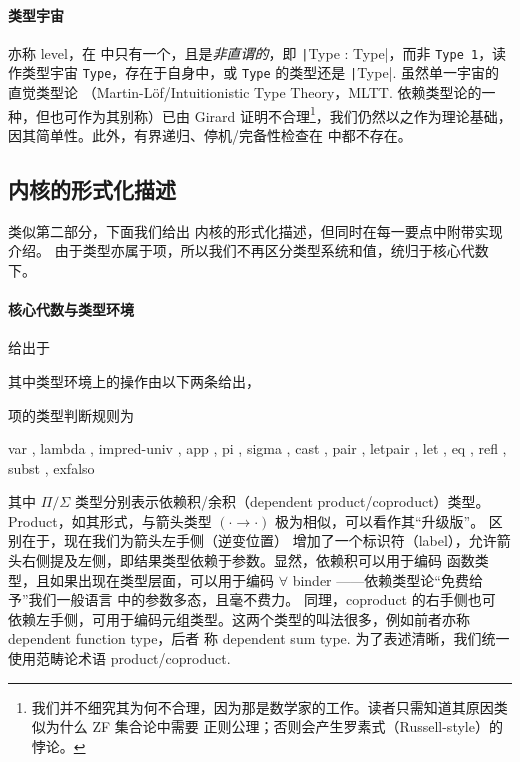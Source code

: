 \documentclass[a4paper, 11pt]{article}
\theoremstyle{remark}\newtheorem*{remark}{Remark}
\theoremstyle{definition}\newtheorem*{definition}{Definition}
\begin{document}
\paragraph{类型宇宙} 亦称 level，在 \Tigrisd 中只有一个，且是\emph{非直谓的}，即 \texttt|Type : Type|，而非 \texttt{Type 1}，读作类型宇宙 \texttt{Type}，存在于自身中，或
\texttt{Type} 的类型还是 \texttt|Type|. 虽然单一宇宙的直觉类型论
（Martin-Löf/Intuitionistic Type Theory，MLTT. 依赖类型论的一种，但也可作为其别称）已由
Girard 证明不合理\footnote{
我们并不细究其为何不合理，因为那是数学家的工作。读者只需知道其原因类似为什么 ZF 集合论中需要
正则公理；否则会产生罗素式（Russell-style）的悖论。
}，我们仍然以之作为理论基础，因其简单性。此外，有界递归、停机/完备性检查在 \Tigrisd 中都不存在。

\subsection{\Tigrisd 内核的形式化描述}
类似第二部分，下面我们给出 \Tigrisd 内核的形式化描述，但同时在每一要点中附带实现介绍。
由于类型亦属于项，所以我们不再区分类型系统和值，统归于核心代数下。

\paragraph{核心代数与类型环境} 给出于


其中类型环境上的操作由以下两条给出，


项的类型判断规则为

{ var
, lambda
, impred-univ
, app
, pi
, sigma
, cast
, pair
, letpair
, let
, eq
, refl
, subst
, exfalso}

其中 $\Pi/\Sigma$ 类型分别表示依赖积/余积（dependent product/coproduct）类型。
Product，如其形式，与箭头类型 $(\cdot\to\cdot)$ 极为相似，可以看作其“升级版”。
区别在于，现在我们为箭头左手侧（逆变位置）
增加了一个标识符（label），允许箭头右侧提及左侧，即结果类型依赖于参数。显然，依赖积可以用于编码
函数类型，且如果出现在类型层面，可以用于编码 $\forall$ binder ——依赖类型论“免费给予”我们一般语言
中的参数多态，且毫不费力。
同理，coproduct 的右手侧也可
依赖左手侧，可用于编码元组类型。这两个类型的叫法很多，例如前者亦称 dependent function type，后者
称 dependent sum type. 为了表述清晰，我们统一使用范畴论术语 product/coproduct.
\end{document}
